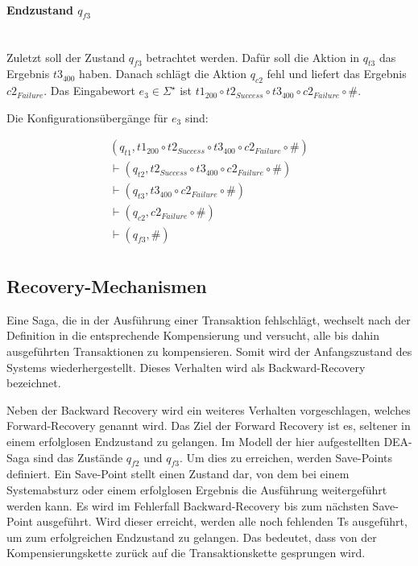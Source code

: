 \paragraph*{Endzustand $q_{f3}$} \mbox{}\\
Zuletzt soll der Zustand $q_{f3}$ betrachtet werden. Dafür soll die Aktion in $q_{t3}$ das Ergebnis $t3_{400}$ haben. Danach schlägt die Aktion $q_{c2}$ fehl und liefert das Ergebnis $c2_{Failure}$. Das Eingabewort $e_3 \in \Sigma^{\star}$ ist $t1_{200} \circ t2_{Success} \circ t3_{400} \circ c2_{Failure} \circ \#$.

Die Konfigurationsübergänge für $e_3$ sind:

\begin{align*}
	(q_{t1}, t1_{200} \circ t2_{Success} \circ t3_{400} \circ c2_{Failure} \circ \#) \\
	\vdash (q_{t2}, t2_{Success} \circ t3_{400} \circ c2_{Failure} \circ \#) \\
	\vdash (q_{t3}, t3_{400} \circ c2_{Failure} \circ \#) \\
	\vdash (q_{c2}, c2_{Failure} \circ \#) \\
	\vdash (q_{f3}, \#) \\
\end{align*}

\subsection{Recovery-Mechanismen} %
Eine Saga, die in der Ausführung einer Transaktion fehlschlägt, wechselt nach der Definition in die entsprechende Kompensierung und versucht, alle bis dahin ausgeführten Transaktionen zu kompensieren. Somit wird der Anfangszustand des Systems wiederhergestellt. Dieses Verhalten wird als Backward-Recovery bezeichnet. 

Neben der Backward Recovery wird ein weiteres Verhalten vorgeschlagen, welches Forward-Recovery genannt wird. Das Ziel der Forward Recovery ist es, seltener in einem erfolglosen Endzustand zu gelangen. Im Modell der hier aufgestellten DEA-Saga sind das Zustände $q_{f2}$ und $q_{f3}$. Um dies zu erreichen, werden Save-Points definiert. Ein Save-Point stellt einen Zustand dar, von dem bei einem Systemabsturz oder einem erfolglosen Ergebnis die Ausführung weitergeführt werden kann. Es wird im Fehlerfall Backward-Recovery bis zum nächsten Save-Point ausgeführt. Wird dieser erreicht, werden alle noch fehlenden Ts ausgeführt, um zum erfolgreichen Endzustand zu gelangen. Das bedeutet, dass von der Kompensierungskette zurück auf die Transaktionskette gesprungen wird.


